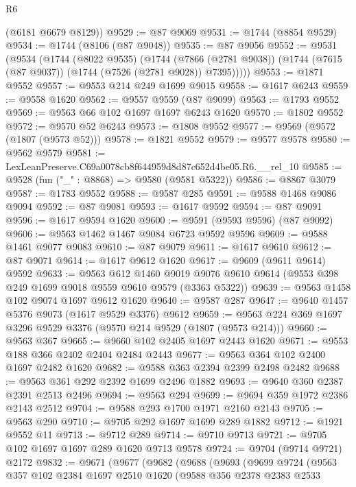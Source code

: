 \begin{lexlean}{R6}
\begin{coremodule}
      (@6181 @6679 @8129))
@9529 := @87 @9069
@9531 := @1744 (@8854 @9529)
@9534 := @1744 (@8106 (@87 @9048))
@9535 := @87 @9056
@9552 := @9531
    (@9534
      (@1744
        (@8022 @9535)
        (@1744
          (@7866 (@2781 @9038))
          (@1744 (@7615 (@87 @9037)) (@1744 (@7526 (@2781 @9028)) @7395)))))
@9553 := @1871 @9552
@9557 := @9553 @214 @249 @1699 @9015
@9558 := @1617 @6243
@9559 := @9558 @1620
@9562 := @9557 @9559 (@87 @9099)
@9563 := @1793 @9552
@9569 := @9563 @66 @102 @1697 @1697 @6243 @1620
@9570 := @1802 @9552
@9572 := @9570 @52 @6243
@9573 := @1808 @9552
@9577 := @9569 (@9572 (@1807 (@9573 @52)))
@9578 := @1821 @9552
@9579 := @9577 @9578
@9580 := @9562 @9579
@9581 := LexLeanPreserve.C69a0078cb8f644959d8d87c652d4be05.R6.__rel_10
@9585 := @9528 (fun ("_" : @8868) => @9580 (@9581 @5322))
@9586 := @8867 @3079
@9587 := @1783 @9552
@9588 := @9587 @285
@9591 := @9588 @1468 @9086 @9094
@9592 := @87 @9081
@9593 := @1617 @9592
@9594 := @87 @9091
@9596 := @1617 @9594 @1620
@9600 := @9591 (@9593 @9596) (@87 @9092)
@9606 := @9563 @1462 @1467 @9084 @6723 @9592 @9596
@9609 := @9588 @1461 @9077 @9083
@9610 := @87 @9079
@9611 := @1617 @9610
@9612 := @87 @9071
@9614 := @1617 @9612 @1620
@9617 := @9609 (@9611 @9614) @9592
@9633 := @9563
    @612
    @1460
    @9019
    @9076
    @9610
    @9614
    (@9553 @398 @249 @1699 @9018 @9559 @9610 @9579 (@3363 @5322))
@9639 := @9563 @1458 @102 @9074 @1697 @9612 @1620
@9640 := @9587 @287
@9647 := @9640 @1457 @5376 @9073 (@1617 @9529 @3376) @9612
@9659 := @9563 @224 @369 @1697 @3296 @9529 @3376 (@9570 @214 @9529 (@1807 (@9573 @214)))
@9660 := @9563 @367
@9665 := @9660 @102 @2405 @1697 @2443 @1620
@9671 := @9553 @188 @366 @2402 @2404 @2484 @2443
@9677 := @9563 @364 @102 @2400 @1697 @2482 @1620
@9682 := @9588 @363 @2394 @2399 @2498 @2482
@9688 := @9563 @361 @292 @2392 @1699 @2496 @1882
@9693 := @9640 @360 @2387 @2391 @2513 @2496
@9694 := @9563 @294
@9699 := @9694 @359 @1972 @2386 @2143 @2512
@9704 := @9588 @293 @1700 @1971 @2160 @2143
@9705 := @9563 @290
@9710 := @9705 @292 @1697 @1699 @289 @1882
@9712 := @1921 @9552 @11
@9713 := @9712 @289
@9714 := @9710 @9713
@9721 := @9705 @102 @1697 @1697 @289 @1620 @9713 @9578
@9724 := @9704 (@9714 @9721) @2172
@9832 := @9671
    (@9677
      (@9682
        (@9688
          (@9693
            (@9699
              @9724
              (@9563
                @357
                @102
                @2384
                @1697
                @2510
                @1620
                (@9588
                  @356
                  @2378
                  @2383
                  @2533

\end{coremodule}
\end{lexlean}
